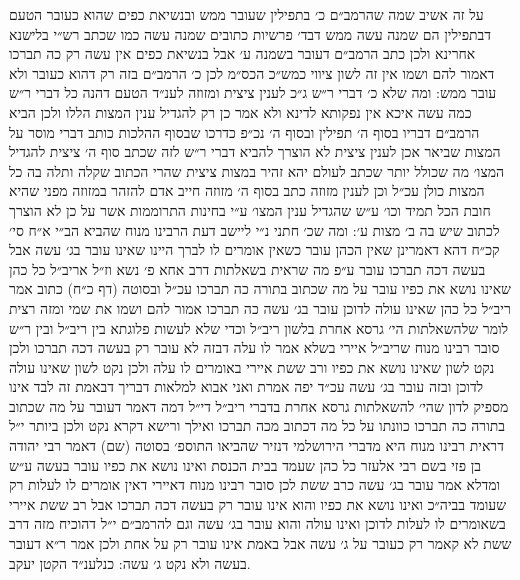 \documentclass[12pt, openany]{book}
\begin{document}
\begin{multicols}{2}
על זה אשיב שמה שהרמב״ם כ׳ בתפילין שעובר ממש ובנשיאת כפים שהוא כעובר הטעם דבתפילין הם שמנה עשה ממש דבד׳ פרשיות כתובים שמנה עשה כמו שכתב רש״י בלישנא אחרינא ולכן כתב הרמב״ם דעובר בשמנה ע׳ אבל בנשיאת כפים אין עשה רק כה תברכו דאמור להם ושמו אין זה לשון ציווי כמש״כ הכס״מ לכן כ׳ הרמב״ם בזה רק דהוא כעובר ולא עובר ממש: ומה שלא כ׳ דברי ר״ש ג״כ לענין ציצית ומזוזה לענ״ד הטעם דהנה כל דברי ר״ש כמה עשה איכא אין נפקותא לדינא ולא אמר כן רק להגדיל ענין המצות הללו ולכן הביא הרמב״ם דבריו בסוף ה׳ תפילין ובסוף ה׳ נכ״פ כדרכו שבסוף ההלכות כותב דברי מוסר על המצות שביאר אכן לענין ציצית לא הוצרך להביא דברי ר״ש לזה שכתב סוף ה׳ ציצית להגדיל המצו׳ מה שכולל יותר שכתב לעולם יהא זהיר במצות ציצית שהרי הכתוב שקלה ותלה בה כל המצות כולן עכ״ל וכן לענין מזוזה כתב בסוף ה׳ מזוזה חייב אדם להזהר במזוזה מפני שהיא חובת הכל תמיד וכו׳ ע״ש שהגדיל ענין המצו׳ ע״י בחינות התרוממות אשר על כן לא הוצרך לכתוב שיש בה ב׳ מצות ע׳: ומה שכ׳ חתני נ״י ליישב דעת הרבינו מנוח שהביא הב״י א״ח סי׳ קכ״ח דהא דאמרינן שאין הכהן עובר כשאין אומרים לו לברך היינו שאינו עובר בג׳ עשה אבל בעשה דכה תברכו עובר ע״פ מה שראית בשאלתות דרב אחא פ׳ נשא וז״ל אריב״ל כל כהן שאינו נושא את כפיו עובר על מה שכתוב בתורה כה תברכו עכ״ל ובסוטה (דף כ״ח) כתוב אמר ריב״ל כל כהן שאינו עולה לדוכן עובר בג׳ עשה כה תברכו אמור להם ושמו את שמי ומזה רצית לומר שלהשאלתות הי׳ גרסא אחרת בלשון ריב״ל וכדי שלא לעשות פלוגתא בין ריב״ל ובין ר״ש סובר רבינו מנוח שריב״ל איירי בשלא אמר לו עלה דבזה לא עובר רק בעשה דכה תברכו ולכן נקט לשון שאינו נושא את כפיו ורב ששת איירי באומרים לו עלה ולכן נקט לשון שאינו עולה לדוכן ובזה עובר בג׳ עשה עכ״ד יפה אמרת ואני אבוא למלאות דבריך דבאמת זה לבד אינו מספיק לדון שהי׳ להשאלתות גרסא אחרת בדברי ריב״ל די״ל דמה דאמר דעובר על מה שכתוב בתורה כה תברכו כוונתו על כל מה דכתוב מכה תברכו ואילך ורישא דקרא נקט ולכן ביותר י״ל דראית רבינו מנוח היא מדברי הירושלמי דנזיר שהביאו התוספ׳ בסוטה (שם) דאמר רבי יהודה בן פזי בשם רבי אלעזר כל כהן שעמד בבית הכנסת ואינו נושא את כפיו עובר בעשה ע״ש ומדלא אמר עובר בג׳ עשה כרב ששת לכן סובר רבינו מנוח דאיירי דאין אומרים לו לעלות רק שעומד בביה״כ ואינו נושא את כפיו והוא אינו עובר רק בעשה דכה תברכו אבל רב ששת איירי בשאומרים לו לעלות לדוכן ואינו עולה והוא עובר בג׳ עשה וגם להרמב״ם י״ל דהוכיח מזה דרב ששת לא קאמר רק כעובר על ג׳ עשה אבל באמת אינו עובר רק על אחת ולכן אמר ר״א דעובר בעשה ולא נקט ג׳ עשה: כנלענ״ד הקטן יעקב.\\\vspace{0pt}

\end{multicols}\newpage
\end{document}
